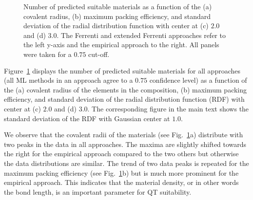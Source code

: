 \documentclass[superscriptaddress,unsortedaddress,
 amsmath,amssymb,
 aps,
]{revtex4-2}
\begin{document}
\begin{figure}[ht!]
\begin{subfigure}[t]{1\textwidth}
    
\end{subfigure}
\begin{subfigure}[b]{0.45\textwidth}
    \scalebox{0.85}{}
    \subcaption{}
\end{subfigure}
\begin{subfigure}[b]{0.45\textwidth}
    \scalebox{0.85}{}
    \subcaption{}
\end{subfigure}%

\begin{subfigure}[b]{0.45\textwidth}
    \scalebox{0.85}{}
    \subcaption{}
\end{subfigure}
\begin{subfigure}[b]{0.45\textwidth}
    \scalebox{0.85}{}
    \subcaption{}
\end{subfigure}%
\caption{Number of predicted suitable materials as a function of the (a) covalent radius, (b) maximum packing efficiency, and standard deviation of the radial distribution function with center at (c) $2.0$ and (d) $3.0$. 
The Ferrenti and extended Ferrenti approaches refer to the left y-axis and the empirical approach to the right. All panels were taken for a $0.75$ cut-off. }
\label{fig:histograms_supp1}
\end{figure}

Figure~\ref{fig:histograms_supp1} displays the number of predicted suitable materials for all approaches (all ML methods in an approach agree to a $0.75$ confidence level) as a function of the (a) covalent radius of the elements in the composition, (b) maximum packing efficiency, and standard deviation of the radial distribution function (RDF) with center at (c) $2.0$ and (d) $3.0$. The corresponding figure in the main text shows the standard deviation of the RDF with Gaussian center at $1.0$. 

We observe that the covalent radii of the materials (see Fig.~\ref{fig:histograms_supp1}a) distribute with two peaks in the data in all approaches. The maxima are slightly shifted towards the right for the empirical approach compared to the two others but otherwise the data distributions are similar. The trend of two data peaks is repeated for the maximum packing efficiency (see Fig.~\ref{fig:histograms_supp1}b) but is much more prominent for the empirical approach. This indicates that the material density, or in other words the bond length, is an important parameter for QT suitability.  
\end{document}
